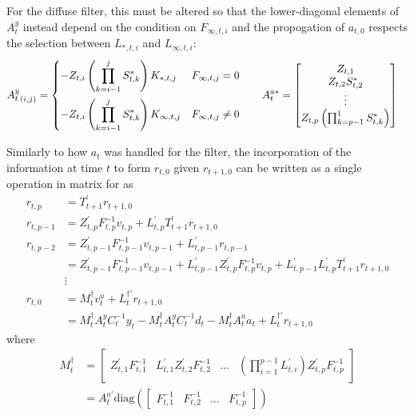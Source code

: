 \documentclass[12pt]{article}
\begin{document}
	For the diffuse filter, this must be altered so that the lower-diagonal elements of $A_t^y$ instead depend on the condition on $F_{\infty,t,i}$ and the propogation of $a_{t,0}$ respects the selection between $L_{*,t,i}$ and $L_{\infty,t,i}$:
	\begin{align*}
	{A_t^y}_{(i,j)} = \begin{dcases}
	-Z_{t,i} \left(\prod_{k=i-1}^j S_{t,k}^* \right) K_{*,t,j}  &  F_{\infty,t,j} = 0 \\
	-Z_{t,i} \left(\prod_{k=i-1}^j S_{t,k}^* \right) K_{\infty,t,j}  & F_{\infty,t,j} \neq 0 
	\end{dcases}
	&\qquad
	A_t^{a*} = \begin{bmatrix}
	Z_{t,1} \\
	Z_{t,2} S_{t,2}^* \\
	\vdots \\
	Z_{t,p} \left(\prod_{k=p-1}^1 S_{t,k}^* \right) 
	\end{bmatrix} 
	\end{align*}

	Similarly to how $a_t$ was handled for the filter, the incorporation of the information at time $t$ to form $r_{t,0}$ given $r_{t+1,0}$ can be written as a single operation in matrix for as
	\begin{align*}
	r_{t,p} &= T_{t+1}^\prime r_{t+1,0} \\
	r_{t,p-1} &= Z_{t,p}^\prime F_{t,p}^{-1} v_{t,p} + L_{t,p}^\prime T_{t+1}^\prime r_{t+1,0} \\
	r_{t,p-2} &= Z_{t,p-1}^\prime F_{t,p-1}^{-1} v_{t,p-1} + L_{t,p-1}^\prime r_{t,p-1} \\
		&= Z_{t,p-1}^\prime F_{t,p-1}^{-1} v_{t,p-1} + L_{t,p-1}^\prime Z_{t,p}^\prime F_{t,p}^{-1} v_{t,p} + L_{t,p-1}^\prime L_{t,p}^\prime T_{t+1}^\prime r_{t+1,0} \\ 
		&\vdots \\
	r_{t,0} &= M_t^\dagger v_t^u + L_t^{\dagger\prime} r_{t+1,0} \\
			&= M_t^\dagger A_t^y C_t^{-1} y_t - M_t^\dagger A_t^y C_t^{-1} d_t - M_t^\dagger A_t^a a_t + L_t^{\dagger\prime} r_{t+1,0}
	\end{align*}
	where 
	\begin{align*}
	M_t^\dagger &= \begin{bmatrix} Z_{t,1}^\prime F_{t,1}^{-1} &  L_{t,1}^\prime Z_{t,2}^\prime F_{t,2}^{-1} & \dots & \left(\prod_{i=1}^{p-1} L_{t,i}^\prime \right)  Z_{t,p}^\prime F_{t,p}^{-1} \end{bmatrix} \\
	&= A_t^{a\prime} \text{diag}\left( \begin{bmatrix} F_{t,1}^{-1} &  F_{t,2}^{-1} & \dots &  F_{t,p}^{-1} \end{bmatrix}  \right)
	\end{align*}
\end{document}
